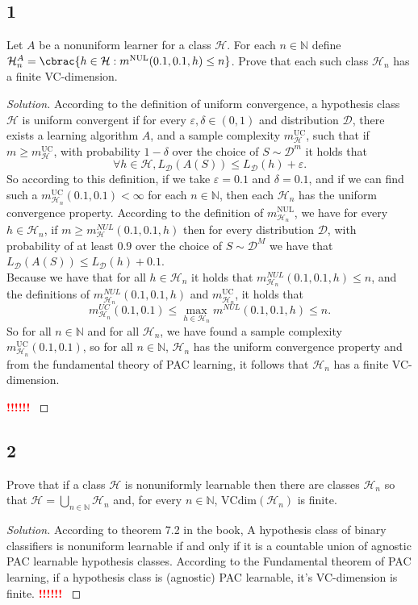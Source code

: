 \documentclass[10pt, a4paper, twoside]{amsart}
\theoremstyle{plain}
\newcommand{\N}{\ensuremath{\mathbb{N}}}
\DeclarePairedDelimiter\cbrac\{\}
\newcommand{\cH}{\ensuremath{\mathcal{H}}}
\newcommand{\cD}{\ensuremath{\mathcal{D}}}
\newenvironment{solution}
               {\let\oldqedsymbol=\qedsymbol
                \renewcommand{\qedsymbol}{$\blacktriangleleft$}
                \begin{proof}[Solution]}
               {\end{proof}
                \renewcommand{\qedsymbol}{\oldqedsymbol}}
\newcommand{\TODO}{\textcolor{red}{\textbf{!!!!!! }}}
\begin{document}
\subsection*{1}
Let $A$ be a nonuniform learner for a class $\cH$. For each $n \in \N$ define $\cH_n^A = \cbrac{ h \in \cH : m^{\text{NUL}}(0.1,0.1,h)\leq n}$. Prove that each such class $\cH_n$ has a finite VC-dimension.
\begin{solution}
  According to the definition of uniform convergence, a hypothesis class $\cH$ is uniform convergent if for every $\varepsilon, \delta \in (0,1)$ and distribution $\cD$, there exists a learning algorithm $A$, and a sample complexity $m_{\cH}^{\text{UC}}$, such that if $m \geq m_{\cH}^{\text{UC}}$, with probability $1- \delta$ over the choice of $S\sim \cD^m$ it holds that
  \begin{equation*}
    \forall h \in \cH, L_{\cD}(A(S)) \leq L_{\cD}(h) + \varepsilon.
  \end{equation*}
  So according to this definition, if we take $\varepsilon = 0.1$ and $\delta = 0.1$, and if we can find such a $m_{\cH_n}^{\text{UC}}(0.1,0.1) < \infty$ for each $n \in \N$, then each $\cH_n$ has the uniform convergence property.
  According to the definition of $m_{\cH_n}^{\text{NUL}}$, we have for every $h \in \cH_n$, if $m \geq m_{\cH}^{NUL}(0.1, 0.1, h)$ then for every distribution $\cD$, with probability of at least $0.9$ over the choice of $S \sim \cD^M$ we have that $L_{\cD}(A(S)) \leq L_{\cD}(h) + 0.1$.\\
  Because we have that for all $h \in \cH_n$ it holds that $m_{\cH_n}^{NUL}(0.1,0.1,h) \leq n$, and the definitions of $m_{\cH_n}^{NUL}(0.1,0.1,h)$ and $m_{\cH_n}^{\text{UC}}$, it holds that
  \begin{equation*}
    m^{UC}_{\cH_n}(0.1,0.1) \leq \max_{h \in \cH_n}m^{NUL}(0.1,0.1,h) \leq n.
  \end{equation*}
  So for all $n \in \N$ and for all $\cH_n$, we have found a sample complexity $m_{\cH_n}^{\text{UC}}(0.1,0.1)$, so for all $n \in \N$, $\cH_n$ has the uniform convergence property and from the fundamental theory of PAC learning, it follows that $\cH_n$ has a finite VC-dimension.
  
\TODO 
\end{solution}
\subsection*{2}
Prove that if a class $\cH$ is nonuniformly learnable then there are classes $\cH_n$ so that $\cH = \bigcup_{n \in \N}\cH_n$ and, for every $n \in \N$, $\text{VCdim}(\cH_n)$ is finite.
\begin{solution}
 According to theorem 7.2 in the book, A hypothesis class of binary classifiers is nonuniform learnable if and only if it is a countable union of agnostic PAC learnable hypothesis classes. According to the Fundamental theorem of PAC learning, if a hypothesis class is (agnostic) PAC learnable, it's VC-dimension is finite. 
\TODO 
\end{solution}
\end{document}

